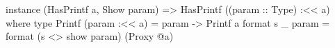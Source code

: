 \begin{code}
instance (HasPrintf a, Show param)
    => HasPrintf ((param :: Type) :<< a) where
  type Printf (param :<< a) = param -> Printf a
  format s _ param = format (s <> show param) (Proxy @a)
\end{code}
